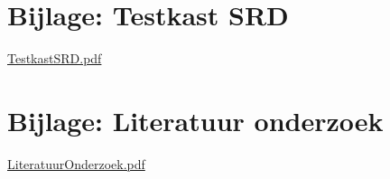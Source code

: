 \appendix

\section{Bijlage: Testkast SRD} \label{sec:TestKastSRD}

\href{run:TestkastSRD.pdf}{TestkastSRD.pdf}

\section{Bijlage: Literatuur onderzoek} \label{sec:LiteratuurOnderzoek}

\href{run:LiteratuurOnderzoek.pdf}{LiteratuurOnderzoek.pdf}